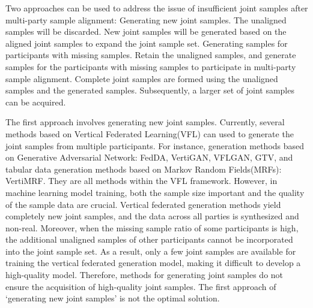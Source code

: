 \documentclass[final,1p,times]{elsarticle}
\begin{document}
Two approaches can be used to address the issue of insufficient joint samples after multi-party sample alignment:  Generating new joint samples. The unaligned samples will be discarded. New joint samples will be generated based on the aligned joint samples to expand the joint sample set.  Generating samples for participants with missing samples. Retain the unaligned samples, and generate samples for the participants with missing samples to participate in multi-party sample alignment. Complete joint samples are formed using the unaligned samples and the generated samples. Subsequently, a larger set of joint samples can be acquired.

The first approach involves generating new joint samples. Currently, several methods based on Vertical Federated Learning(VFL) can used to generate the joint samples from multiple participants. For instance, generation methods based on Generative Adversarial Network: FedDA\cite{2}, VertiGAN\cite{3}, VFLGAN\cite{4}, GTV\cite{5}, and tabular data generation methods based on Markov Random Fields(MRFs): VertiMRF\cite{6}. They are all methods within the VFL framework. However, in machine learning model training, both the sample size important and the quality of the sample data are crucial. Vertical federated generation methods yield completely new joint samples, and the data across all parties is synthesized and non-real. Moreover, when the missing sample ratio of some participants is high, the additional unaligned samples of other participants cannot be incorporated into the joint sample set. As a result, only a few joint samples are available for training the vertical federated generation model, making it difficult to develop a high-quality model. Therefore, methods for generating joint samples do not ensure the acquisition of high-quality joint samples. The first approach of ‘generating new joint samples’ is not the optimal solution.
\end{document}
